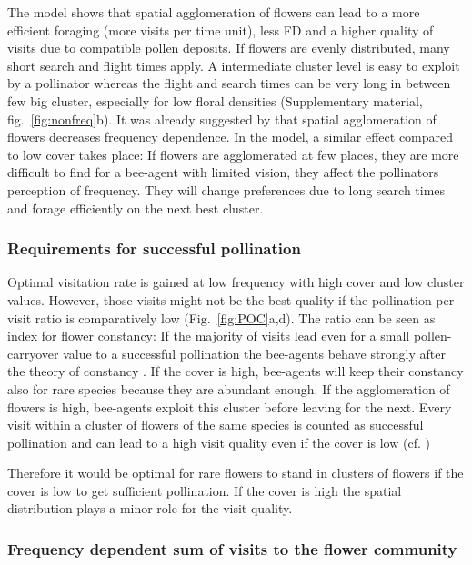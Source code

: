 The model shows that spatial agglomeration of flowers can lead to a more efficient foraging (more visits per time unit), less FD and a higher quality of visits due to compatible pollen deposits. If flowers are evenly distributed, many short search and flight times apply. A intermediate cluster level is easy to exploit by a pollinator whereas the flight and search times can be very long in between few big cluster, especially for low floral densities (Supplementary material, fig.~\ref{fig:nonfreq}b). 
It was already suggested by \cite{epperson1987frequency} that spatial agglomeration of flowers decreases frequency dependence. In the model, a similar effect compared to low cover takes place: If flowers are agglomerated at few places, they are more difficult to find for a bee-agent with limited vision, they affect the pollinators perception of frequency. They will change preferences due to long search times and forage efficiently on the next best cluster. 

\subsubsection*{Requirements for successful pollination}
Optimal visitation rate is gained at low frequency with high cover and low cluster values. However, those visits might not be the best quality if the pollination per visit ratio is comparatively low (Fig.~\ref{fig:POC}a,d). 
The ratio can be seen as index for flower constancy: If the majority of visits lead even for a small pollen-carryover value to a successful pollination the bee-agents behave strongly after the theory of constancy \citep{montgomery2009pollen}. If the cover is high, bee-agents will keep their constancy also for rare species because they are abundant enough. If the agglomeration of flowers is high, bee-agents exploit this cluster before leaving for the next. Every visit within a cluster of flowers of the same species is counted as successful pollination and can lead to a high visit quality even if the cover is low (cf. \citealt{jakobsson2009relationships})

Therefore it would be optimal for rare flowers to stand in clusters of flowers if the cover is low to get sufficient pollination. If the cover is high the spatial distribution plays a minor role for the visit quality.  


\subsubsection*{Frequency dependent sum of visits to the flower community}

